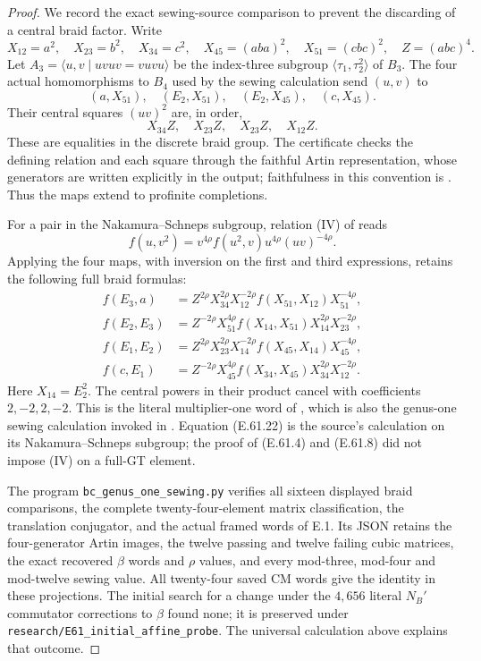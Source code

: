 \begin{proof}
We record the exact sewing-source comparison to prevent the
discarding of a central braid factor.  Write
\[
 X_{12}=a^2,\quad X_{23}=b^2,\quad X_{34}=c^2,\quad
 X_{45}=(aba)^2,\quad X_{51}=(cbc)^2,\quad Z=(abc)^4.
 \tag{E.61.18}
\]
Let $A_3=\langle u,v\mid uvuv=vuvu\rangle$ be the index-three
subgroup $\langle\tau_1,\tau_2^2\rangle$ of $B_3$.
The four actual homomorphisms to $B_4$ used by the sewing
calculation send $(u,v)$ to
\[
 (a,X_{51}),\quad(E_2,X_{51}),\quad
 (E_2,X_{45}),\quad(c,X_{45}).
 \tag{E.61.19}
\]
Their central squares $(uv)^2$ are, in order,
\[
          X_{34}Z,\quad X_{23}Z,\quad X_{23}Z,\quad X_{12}Z.
 \tag{E.61.20}
\]
These are equalities in the discrete braid group.  The certificate
checks the defining relation and each square through the faithful
Artin representation, whose generators are written explicitly in
the output; faithfulness in this convention is
\cite[Theorem A, representation (1) with $k=1$]{BCShpilrain2002}.
Thus the maps extend to profinite completions.

For a pair in the Nakamura--Schneps subgroup, relation (IV) of
\cite[Section 1]{BCNakamuraSchneps2000} reads
\[
 f(u,v^2)=v^{4\rho}f(u^2,v)u^{4\rho}(uv)^{-4\rho}.
 \tag{E.61.21}
\]
Applying the four maps, with inversion on the first and third
expressions, retains the following full braid formulas:
\[
\begin{aligned}
 f(E_3,a)&=Z^{2\rho}X_{34}^{2\rho}X_{12}^{-2\rho}
                    f(X_{51},X_{12})X_{51}^{-4\rho},\\
 f(E_2,E_3)&=Z^{-2\rho}X_{51}^{4\rho}f(X_{14},X_{51})
                    X_{14}^{2\rho}X_{23}^{-2\rho},\\
 f(E_1,E_2)&=Z^{2\rho}X_{23}^{2\rho}X_{14}^{-2\rho}
                    f(X_{45},X_{14})X_{45}^{-4\rho},\\
 f(c,E_1)&=Z^{-2\rho}X_{45}^{4\rho}f(X_{34},X_{45})
                    X_{34}^{2\rho}X_{12}^{-2\rho}.
\end{aligned}
 \tag{E.61.22}
\]
Here $X_{14}=E_2^2$.  The central powers in their product cancel
with coefficients $2,-2,2,-2$.  This is the literal multiplier-one
word of \cite[proof of Claim 8.3, relation $(R')$]{BCNakamuraSchneps2000},
which is also the genus-one sewing calculation invoked in
\cite[Theorems 3.18 and 4.9]{BCBasualdoRobertson2026}.
Equation (E.61.22) is the source's calculation on its
Nakamura--Schneps subgroup; the proof of (E.61.4) and
(E.61.8) did not impose (IV) on a full-GT element.

The program \texttt{bc\_genus\_one\_sewing.py} verifies all sixteen
displayed braid comparisons, the complete twenty-four-element
matrix classification, the translation conjugator, and the actual
framed words of E.1.  Its JSON retains the four-generator Artin
images, the twelve passing and twelve failing cubic matrices,
the exact recovered $\beta$ words and $\rho$ values, and every
mod-three, mod-four and mod-twelve sewing value.  All twenty-four
saved CM words give the identity in these projections.
The initial search for a change under the $4,656$ literal
$N_B'$ commutator corrections to $\beta$ found none; it is
preserved under \texttt{research/E61\_initial\_affine\_probe}.
The universal calculation above explains that outcome.
\end{proof}
